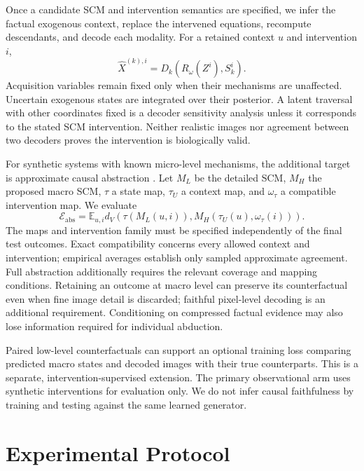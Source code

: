 \documentclass[10pt,twocolumn,letterpaper]{article}
\newcommand{\E}{\mathbb{E}}
\begin{document}
Once a candidate SCM and intervention semantics are specified, we infer the factual exogenous context, replace the intervened equations, recompute descendants, and decode each modality. For a retained context $u$ and intervention $i$,
\begin{equation}
 \widehat X^{(k),i}=D_k(R_\omega(Z^i),S_k^i).
\end{equation}
Acquisition variables remain fixed only when their mechanisms are unaffected. Uncertain exogenous states are integrated over their posterior. A latent traversal with other coordinates fixed is a decoder sensitivity analysis unless it corresponds to the stated SCM intervention. Neither realistic images nor agreement between two decoders proves the intervention is biologically valid.

For synthetic systems with known micro-level mechanisms, the additional target is approximate causal abstraction \cite{beckers2019,beckers2020}. Let $M_L$ be the detailed SCM, $M_H$ the proposed macro SCM, $\tau$ a state map, $\tau_U$ a context map, and $\omega_\tau$ a compatible intervention map. We evaluate
\begin{equation}
 \mathcal E_{\mathrm{abs}}=
 \E_{u,i}d_V\!\left(
 \tau(M_L(u,i)),M_H(\tau_U(u),\omega_\tau(i))\right).
 \label{eq:abstraction}
\end{equation}
The maps and intervention family must be specified independently of the final test outcomes. Exact compatibility concerns every allowed context and intervention; empirical averages establish only sampled approximate agreement. Full abstraction additionally requires the relevant coverage and mapping conditions. Retaining an outcome at macro level can preserve its counterfactual even when fine image detail is discarded; faithful pixel-level decoding is an additional requirement. Conditioning on compressed factual evidence may also lose information required for individual abduction.

Paired low-level counterfactuals can support an optional training loss comparing predicted macro states and decoded images with their true counterparts. This is a separate, intervention-supervised extension. The primary observational arm uses synthetic interventions for evaluation only. We do not infer causal faithfulness by training and testing against the same learned generator.

\section{Experimental Protocol}
\label{sec:experiments}
\end{document}
